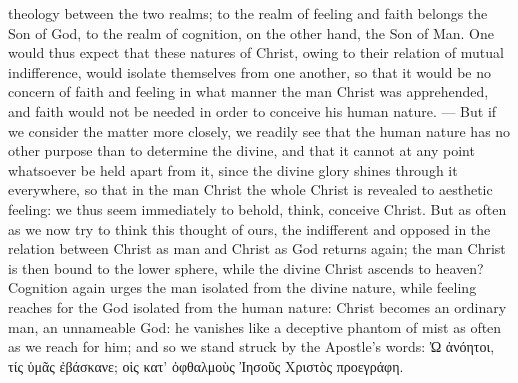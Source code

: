 \documentclass[12pt]{book}
\newcommand{\opage}[1]{\marginnote{\footnotesize\textit{[#1]}}}
\begin{document}
theology between the two realms; to the realm of feeling and faith belongs
the Son of God, to the realm of cognition, on the other hand, the Son of Man.
One would thus expect that these natures of Christ, owing to their relation
of mutual indifference, would isolate themselves from one another, so that it
would be no concern of faith and feeling in what manner the man Christ was
apprehended, and faith would not be needed in order to conceive his human
nature. --- But if we consider the matter more closely, we readily see that
the human nature has no other purpose than to determine the divine, and that
it cannot at any point whatsoever be held apart from it, since the divine
glory shines through it everywhere, so that in the man Christ the whole
Christ is revealed to aesthetic feeling: we thus seem immediately to behold,
think, conceive Christ. But as often as we now try to think this thought of
ours, the indifferent and opposed in the relation between Christ as man and
Christ as God returns again; the man Christ is then bound to the lower sphere,
while the divine Christ ascends to heaven? Cognition again urges the man
isolated from the divine nature, while feeling reaches for the God isolated
from the
\opage{125} human nature: Christ becomes an ordinary man, an unnameable God: he vanishes
like a deceptive phantom of mist as often as we reach for him; and so we
stand struck by the Apostle's words: Ὠ ἀνόητοι, τίς ὑμᾶς ἐβάσκανε; οἱς κατ'
ὀφθαλμοὺς Ἰησοῦς Χριστὸς προεγράφη.
\end{document}
